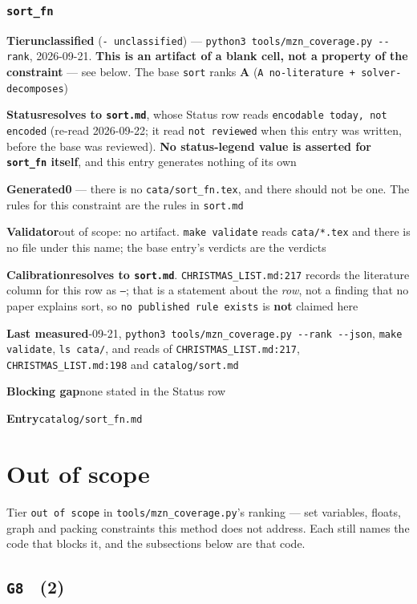\documentclass[10pt,a4paper]{article}
\newcommand{\entryfield}[2]{{\raggedright\textbf{#1}\quad #2\par}}
\begin{document}
\subsubsection*{\texttt{sort\_\allowbreak{}fn}}
\label{entry:sort-fn}
\entryfield{Tier}{\textbf{unclassified} (\texttt{- unclassified}) --- \texttt{python3 tools/\allowbreak{}mzn\_\allowbreak{}coverage.\allowbreak{}py -\allowbreak{}-\allowbreak{}rank}, 2026-09-21. \textbf{This is an artifact of a blank cell, not a property of the constraint} --- see below. The base \texttt{sort} ranks \textbf{A} (\texttt{A no-\allowbreak{}literature + solver-\allowbreak{}decomposes})}
\entryfield{Status}{\textbf{resolves to \texttt{sort.md}}, whose Status row reads \texttt{encodable today, not encoded} (re-read 2026-09-22; it read \texttt{not reviewed} when this entry was written, before the base was reviewed). \textbf{No status-legend value is asserted for \texttt{sort\_fn} itself}, and this entry generates nothing of its own}
\entryfield{Generated}{\textbf{0} --- there is no \texttt{cata/sort\_fn.tex}, and there should not be one. The rules for this constraint are the rules in \texttt{sort.md}}
\entryfield{Validator}{out of scope: no artifact. \texttt{make validate} reads \texttt{cata/*.tex} and there is no file under this name; the base entry's verdicts are the verdicts}
\entryfield{Calibration}{\textbf{resolves to \texttt{sort.md}}. \texttt{CHRISTMAS\_LIST.md:217} records the literature column for this row as \texttt{---}; that is a statement about the \emph{row}, not a finding that no paper explains sort, so \texttt{no published rule exists} is \textbf{not} claimed here}
\entryfield{Last measured}{2026-09-21, \texttt{python3 tools/\allowbreak{}mzn\_\allowbreak{}coverage.\allowbreak{}py -\allowbreak{}-\allowbreak{}rank -\allowbreak{}-\allowbreak{}json}, \texttt{make validate}, \texttt{ls cata/}, and reads of \texttt{CHRISTMAS\_LIST.md:217}, \texttt{CHRISTMAS\_LIST.md:198} and \texttt{catalog/sort.md}}
\entryfield{Blocking gap}{none stated in the Status row}
\entryfield{Entry}{\texttt{catalog/sort\_fn.md}}
\clearpage
\section{Out of scope}
Tier \texttt{out of scope} in \texttt{tools/mzn\_coverage.py}'s ranking --- set variables, floats, graph and packing constraints this method does not address. Each still names the code that blocks it, and the subsections below are that code.
\subsection*{\texttt{G8} \ \normalsize(2)}
\end{document}
